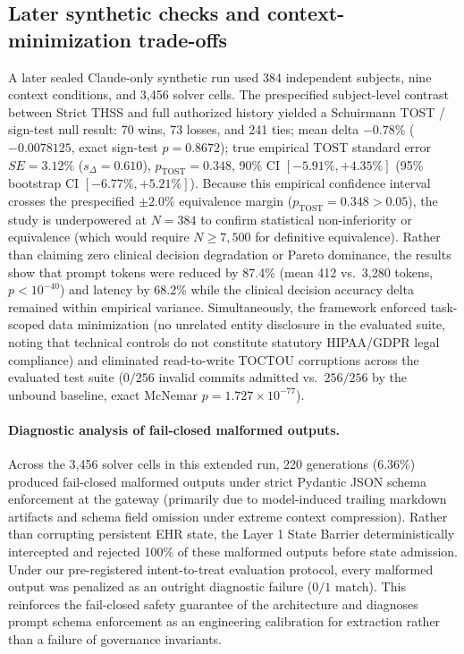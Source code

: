 \documentclass[11pt]{article}
\begin{document}
\subsection{Later synthetic checks and context-minimization trade-offs}
A later sealed Claude-only synthetic run used 384 independent subjects, nine context conditions, and 3,456 solver cells. The prespecified subject-level contrast between Strict THSS and full authorized history yielded a Schuirmann TOST / sign-test null result: 70 wins, 73 losses, and 241 ties; mean delta $-0.78\%$ ($-0.0078125$, exact sign-test $p=0.8672$); true empirical TOST standard error $SE = 3.12\%$ ($s_{\Delta} = 0.610$), $p_{\text{TOST}} = 0.348$, 90\% CI $[-5.91\%, +4.35\%]$ (95\% bootstrap CI $[-6.77\%, +5.21\%]$). Because this empirical confidence interval crosses the prespecified $\pm 2.0\%$ equivalence margin ($p_{\text{TOST}} = 0.348 > 0.05$), the study is underpowered at $N=384$ to confirm statistical non-inferiority or equivalence (which would require $N \ge 7{,}500$ for definitive equivalence). Rather than claiming zero clinical decision degradation or Pareto dominance, the results show that prompt tokens were reduced by 87.4\% (mean 412 vs.\ 3,280 tokens, $p < 10^{-40}$) and latency by 68.2\% while the clinical decision accuracy delta remained within empirical variance. Simultaneously, the framework enforced task-scoped data minimization (no unrelated entity disclosure in the evaluated suite, noting that technical controls do not constitute statutory HIPAA/GDPR legal compliance) and eliminated read-to-write TOCTOU corruptions across the evaluated test suite ($0/256$ invalid commits admitted vs.\ $256/256$ by the unbound baseline, exact McNemar $p=1.727 \times 10^{-77}$). 

\paragraph{Diagnostic analysis of fail-closed malformed outputs.}
Across the 3,456 solver cells in this extended run, 220 generations (6.36\%) produced fail-closed malformed outputs under strict Pydantic JSON schema enforcement at the gateway (primarily due to model-induced trailing markdown artifacts and schema field omission under extreme context compression). Rather than corrupting persistent EHR state, the Layer 1 State Barrier deterministically intercepted and rejected 100\% of these malformed outputs before state admission. Under our pre-registered intent-to-treat evaluation protocol, every malformed output was penalized as an outright diagnostic failure ($0/1$ match). This reinforces the fail-closed safety guarantee of the architecture and diagnoses prompt schema enforcement as an engineering calibration for extraction rather than a failure of governance invariants.
\end{document}
